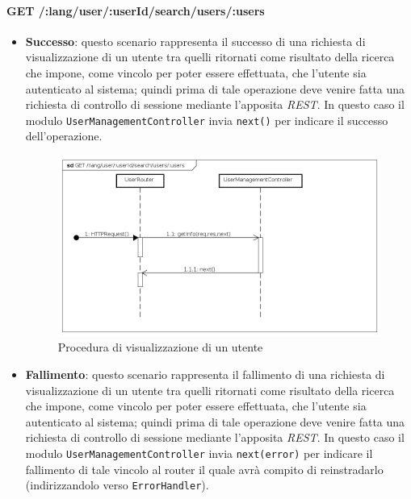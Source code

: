 \paragraph{GET /:lang/user/:userId/search/users/:users}
\begin{itemize}
\item \textbf{Successo}: questo scenario rappresenta il successo di una richiesta di visualizzazione di un utente tra quelli ritornati come risultato della ricerca che impone, come vincolo per poter essere effettuata, che l'utente sia autenticato al sistema; quindi prima di tale operazione deve venire fatta una richiesta di controllo di sessione mediante l'apposita \textit{REST}. In questo caso il modulo \texttt{UserManagementController} invia \texttt{next()} per indicare il successo dell'operazione.

\begin{figure}[ht]
	\centering
	\includegraphics[scale=0.45]{UML/DiagrammiDiSequenza/Back-end/GET__lang_user__userId_search_users__users_success.png}
	\caption{Procedura di visualizzazione di un utente}
\end{figure}
\FloatBarrier

\item \textbf{Fallimento}: questo scenario rappresenta il fallimento di una richiesta di visualizzazione di un utente tra quelli ritornati come risultato della ricerca che impone, come vincolo per poter essere effettuata, che l'utente sia autenticato al sistema; quindi prima di tale operazione deve venire fatta una richiesta di controllo di sessione mediante l'apposita \textit{REST}. In questo caso il modulo \texttt{UserManagementController} invia \texttt{next(error)} per indicare il fallimento di tale vincolo al router il quale avrà compito di reinstradarlo (indirizzandolo verso \texttt{ErrorHandler}).


\end{itemize}
